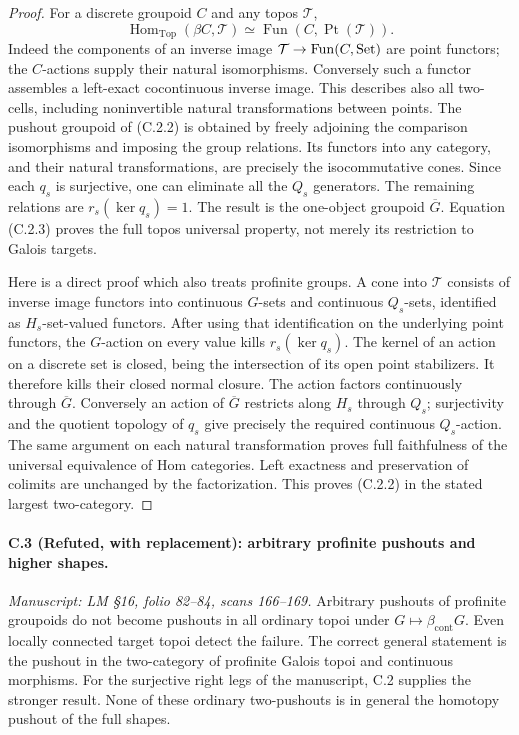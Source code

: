 \begin{proof}
For a discrete groupoid $C$ and any topos $\mathcal T$,
\[
 \operatorname{Hom}_{\mathrm{Top}}(\beta C,\mathcal T)
                \simeq\operatorname{Fun}(C,\operatorname{Pt}(\mathcal T)).
                                                               \tag{C.2.3}
\]
Indeed the components of an inverse image
$\mathcal T\to\mathrm{Fun}(C,\mathrm{Set})$ are point functors; the
$C$-actions supply their natural isomorphisms.
Conversely such a functor assembles a left-exact
cocontinuous inverse image. This describes also all
two-cells, including noninvertible natural
transformations between points. The pushout groupoid
of (C.2.2) is obtained by freely adjoining the
comparison isomorphisms and imposing the group
relations. Its functors into any category, and their
natural transformations, are precisely the
isocommutative cones. Since each $q_s$ is surjective,
one can eliminate all the $Q_s$ generators. The
remaining relations are $r_s(\ker q_s)=1$. The
result is the one-object groupoid $\overline G$.
Equation (C.2.3) proves the full topos universal
property, not merely its restriction to Galois targets.

Here is a direct proof which also treats profinite
groups. A cone into $\mathcal T$ consists of inverse
image functors into continuous $G$-sets and continuous
$Q_s$-sets, identified as $H_s$-set-valued functors.
After using that identification on the underlying
point functors, the $G$-action on every value kills
$r_s(\ker q_s)$. The kernel of an action on a discrete
set is closed, being the intersection of its open
point stabilizers. It therefore kills their closed
normal closure. The action factors continuously
through $\overline G$. Conversely an action of
$\overline G$ restricts along $H_s$ through $Q_s$;
surjectivity and the quotient topology of $q_s$
give precisely the required continuous $Q_s$-action.
The same argument on each natural transformation
proves full faithfulness of the universal equivalence
of Hom categories. Left exactness and preservation
of colimits are unchanged by the factorization.
This proves (C.2.2) in the stated largest two-category.
\end{proof}

\paragraph{C.3 (Refuted, with replacement): arbitrary profinite pushouts and higher shapes.}\label{C3}
\textit{Manuscript: LM \S16, folio 82--84, scans 166--169.}
Arbitrary pushouts of profinite groupoids do not
become pushouts in all ordinary topoi under
$G\mapsto\beta_{\mathrm{cont}}G$. Even locally connected
target topoi detect the failure. The correct general
statement is the pushout in the two-category of
profinite Galois topoi and continuous morphisms.
For the surjective right legs of the manuscript,
C.2 supplies the stronger result. None of these
ordinary two-pushouts is in general the homotopy
pushout of the full shapes.

